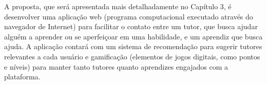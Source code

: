 A proposta, que será apresentada mais detalhadamente no Capítulo 3, é desenvolver uma aplicação web (programa computacional executado através do navegador de Internet) para facilitar o contato entre um tutor, que busca ajudar alguém a aprender ou se aperfeiçoar em uma habilidade, e um aprendiz que busca ajuda. A aplicação contará com um sistema de recomendação para sugerir tutores relevantes a cada usuário e gamificação (elementos de jogos digitais, como pontos e níveis) para manter tanto tutores quanto aprendizes engajados com a plataforma.